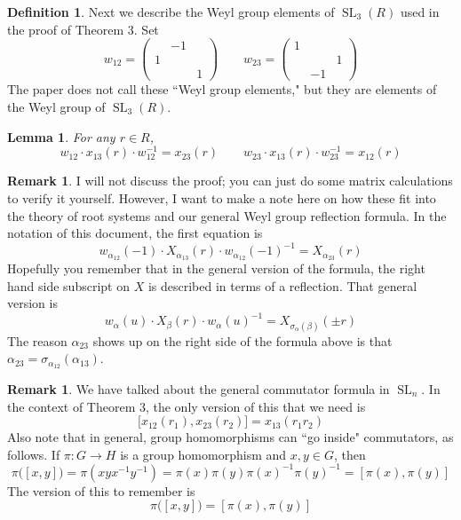 \documentclass[12pt]{article}
\newtheorem{lemma}[theorem]{Lemma}
\theoremstyle{definition}
\newtheorem{definition}[theorem]{Definition}
\newtheorem{remark}[theorem]{Remark}
\newcommand{\sig}{\sigma}
\newcommand{\inv}{^{-1}}
\DeclareMathOperator{\SL}{SL}
\begin{document}
\begin{definition}
Next we describe the Weyl group elements of $\SL_3(R)$ used in the proof of Theorem 3. Set
\[
	w_{12} = 
	\begin{pmatrix}
		& -1 \\
		1 \\
		&& 1
	\end{pmatrix}
	\qquad
	w_{23} =
	\begin{pmatrix}
		1 \\
		&& 1 \\
		& -1
	\end{pmatrix}
\]
The paper does not call these ``Weyl group elements," but they are elements of the Weyl group of $\SL_3(R)$.
\end{definition}

\begin{lemma}
For any $r \in R$, 
\[
	w_{12} \cdot x_{13}(r) \cdot  w_{12} \inv = x_{23}(r) \qquad w_{23} \cdot  x_{13}(r) \cdot  w_{23} \inv = x_{12}(r)
\]
\end{lemma}

\begin{remark}
I will not discuss the proof; you can just do some matrix calculations to verify it yourself. However, I want to make a note here on how these fit into the theory of root systems and our general Weyl group reflection formula. In the notation of this document, the first equation is
\[
	w_{\alpha_{12}}(-1) \cdot X_{\alpha_{13}}(r) \cdot w_{\alpha_{12}}(-1) \inv = X_{\alpha_{23}}(r)
\]
Hopefully you remember that in the general version of the formula, the right hand side subscript on $X$ is described in terms of a reflection. That general version is
\[
	w_\alpha(u) \cdot X_{\beta}(r) \cdot w_\alpha(u) \inv = X_{\sig_\alpha(\beta)} ( \pm r)
\]
The reason $\alpha_{23}$ shows up on the right side of the formula above is that $\alpha_{23} = \sig_{\alpha_{12}} (\alpha_{13})$.
\end{remark}

\begin{remark}
We have talked about the general commutator formula in $\SL_n$. In the context of Theorem 3, the only version of this that we need is
\[
	\Big[ x_{12}(r_1), x_{23}(r_2) \Big] = x_{13}(r_1 r_2)
\]
Also note that in general, group homomorphisms can ``go inside" commutators, as follows. If $\pi:G \to H$ is a group homomorphism and $x,y \in G$, then
\[
	\pi \big( [x,y] \big) = \pi(xyx \inv y \inv) = \pi(x) \pi(y) \pi(x) \inv \pi(y) \inv = [\pi(x), \pi(y)]
\]
The version of this to remember is
\[
	\pi \big( [x,y] \big)  = [\pi(x), \pi(y)]
\]
\end{remark}
\end{document}

